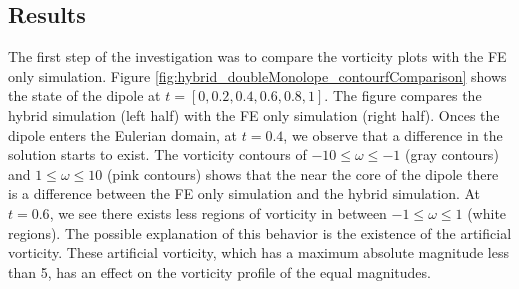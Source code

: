 
\subsection{Results}

The first step of the investigation was to compare the vorticity plots with the FE only simulation. Figure \ref{fig:hybrid_doubleMonolope_contourfComparison} shows the state of the dipole at $t=[0,0.2,0.4,0.6,0.8,1]$. The figure compares the hybrid simulation (left half) with the FE only simulation (right half). Onces the dipole enters the Eulerian domain, at $t=0.4$, we observe that a difference in the solution starts to exist. The vorticity contours of $-10\leqslant \omega\leqslant-1$ (gray contours) and  $1\leqslant \omega\leqslant10$ (pink contours) shows that the near the core of the dipole there is a difference between the FE only simulation and the hybrid simulation. At $t=0.6$, we see there exists less regions of vorticity in between $-1\leqslant\omega\leqslant1$ (white regions). The possible explanation of this behavior is the existence of the artificial vorticity. These artificial vorticity, which has a maximum absolute magnitude less than 5, has an effect on the vorticity profile of the equal magnitudes.

